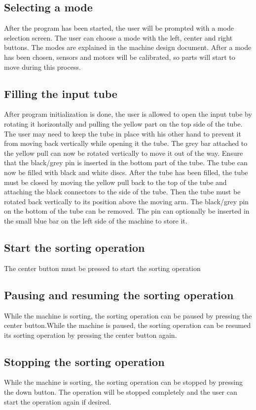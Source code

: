 \documentclass[a4paper,oneside,11pt]{article}
\begin{document}
\subsection{Selecting a mode}
After the program has been started, the user will be prompted with a mode selection screen. The user can choose a mode with the left, center and right buttons. The modes are explained in the machine design document. After a mode has been chosen, sensors and motors will be calibrated, so parts will start to move during this process.

\subsection{Filling the input tube}
After program initialization is done, the user is allowed to open the input tube by rotating it horizontally and pulling the yellow part on the top side of the tube. The user may need to keep the tube in place with his other hand to prevent it from moving back vertically while opening it the tube. The grey bar attached to the yellow pull can now be rotated vertically to move it out of the way. Ensure that the black/grey pin is inserted in the bottom part of the tube. The tube can now be filled with black and white discs. After the tube has been filled, the tube must be closed by moving the yellow pull back to the top of the tube and attaching the black connectors to the side of the tube. Then the tube must be rotated back vertically to its position above the moving arm. The black/grey pin on the bottom of the tube can be removed. The pin can optionally be inserted in the small blue bar on the left side of the machine to store it.

\subsection{Start the sorting operation}
The center button must be pressed to start the sorting operation

\subsection{Pausing and resuming the sorting operation}
While the machine is sorting, the sorting operation can be paused by pressing the center button.While the machine is paused, the sorting operation can be resumed its sorting operation by pressing the center button again.

\subsection{Stopping the sorting operation}
While the machine is sorting, the sorting operation can be stopped by pressing the down button. The operation will be stopped completely and the user can start the operation again if desired.
\end{document}
